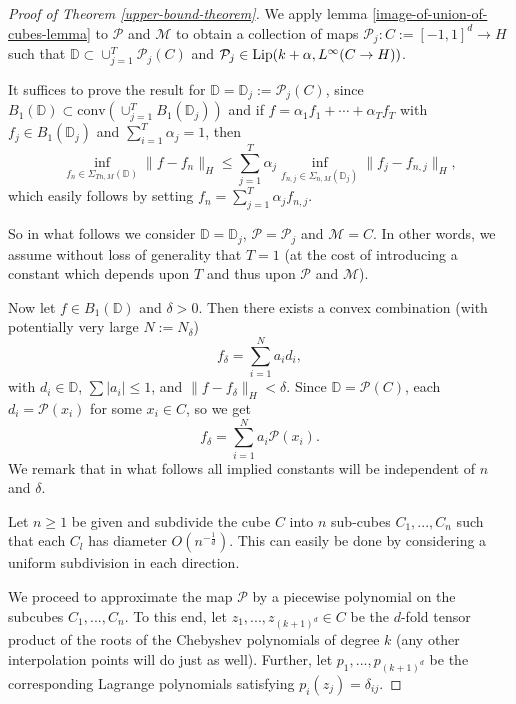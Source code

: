 \begin{proof}[Proof of Theorem \ref{upper-bound-theorem}]
 We apply lemma \ref{image-of-union-of-cubes-lemma} to $\mathcal{P}$ and $\mathcal{M}$ to obtain a collection of maps $\mathcal{P}_j:C:=[-1,1]^d\rightarrow H$ such that $\mathbb{D}\subset \cup_{j=1}^T\mathcal{P}_j(C)$ and $\mathcal{P}_j\in {\rm Lip}(k+\alpha, L^\infty(C\rightarrow H))$. 
 
 It suffices to prove the result for $\mathbb{D} = \mathbb{D}_j := \mathcal{P}_j(C)$, since $B_1(\mathbb{D}) \subset \text{conv}(\cup_{j=1}^T B_1(\mathbb{D}_j))$ and if $f = \alpha_1f_1 +\cdots + \alpha_Tf_T$ with $f_j\in B_1(\mathbb{D}_j)$ and $\sum_{i=1}^T \alpha_j= 1$, then
 \begin{equation}
  \inf_{f_n\in \Sigma_{Tn,M}(\mathbb{D})} \|f - f_n\|_{H} \leq \sum_{j=1}^T \alpha_j\inf_{f_{n,j}\in \Sigma_{n,M}(\mathbb{D}_j)} \|f_j - f_{n,j}\|_{H},
 \end{equation}
 which easily follows by setting $f_n = \sum_{j=1}^T\alpha_jf_{n,j}$.
 
So in what follows we consider $\mathbb{D} = \mathbb{D}_j$, $\mathcal{P} = \mathcal{P}_j$ and $\mathcal{M} = C$. In other words, we assume without loss of generality that $T=1$ (at the cost of introducing a constant which depends upon $T$ and thus upon $\mathcal{P}$ and $\mathcal{M}$).
 
 Now let $f\in B_1(\mathbb{D})$ and $\delta > 0$. Then there exists a convex combination (with potentially very large $N:=N_\delta$)
 \begin{equation}\label{eq-176}
  f_\delta = \sum_{i=1}^N a_id_i,
 \end{equation}
 with $d_i\in \mathbb{D}$, $\sum|a_i| \leq 1$, and $\|f - f_\delta\|_H  < \delta$. Since $\mathbb{D} = \mathcal{P}(C)$, each $d_i = \mathcal{P}(x_i)$ for some $x_i\in C$, so we get 
 \begin{equation}
  f_\delta = \sum_{i=1}^{N} a_i\mathcal{P}(x_i).
 \end{equation}
 We remark that in what follows all implied constants will be independent of $n$ and $\delta$.
 
 Let $n \geq 1$ be given and subdivide the cube $C$ into $n$ sub-cubes $C_1,...,C_n$ such that each $C_l$ has diameter $O(n^{-\frac{1}{d}})$. This can easily be done by considering a uniform subdivision in each direction.
 
 We proceed to approximate the map $\mathcal{P}$ by a piecewise polynomial on the subcubes $C_1,...,C_n$. To this end, let $z_1,...,z_{(k+1)^d}\in C$ be the $d$-fold tensor product of the roots of the Chebyshev polynomials of degree $k$ (any other interpolation points will do just as well). Further, let $p_1,...,p_{(k+1)^d}$ be the corresponding Lagrange polynomials satisfying $p_i(z_j) = \delta_{ij}$. 
 

\end{proof}
